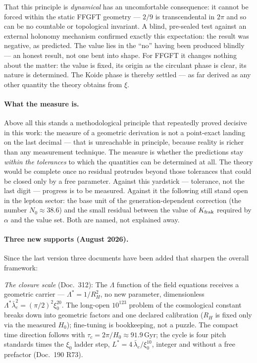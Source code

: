 That this principle is \emph{dynamical} has an uncomfortable consequence:
it cannot be forced within the static FFGFT geometry --- $2/9$ is
transcendental in $2\pi$ and so can be no countable or topological invariant.
A blind, pre-sealed test against an external holonomy mechanism confirmed
exactly this expectation: the result was negative, as predicted. The value
lies in the \enquote{no} having been produced blindly --- an honest result,
not one bent into shape. For FFGFT it changes nothing about the matter: the value
is fixed, its origin as the circulant phase is clear, its nature is
determined. The Koide phase is thereby settled --- as far derived as any other
quantity the theory obtains from $\xi$.

\paragraph{What the measure is.} Above all this stands a methodological
principle that repeatedly proved decisive in this work: the measure of a
geometric derivation is not a point-exact landing on the last decimal ---
that is unreachable in principle, because reality is richer than any
measurement technique. The measure is whether the predictions stay
\emph{within the tolerances} to which the quantities can be determined at
all. The theory would be complete once no residual protrudes beyond those
tolerances that could be closed only by a free parameter. Against this
yardstick --- tolerance, not the last digit --- progress is to be measured.
Against it the following still stand open in the lepton sector: the base
unit of the generation-dependent correction (the number $N_0 \approx 38.6$)
and the small residual between the value of $K_{\rm frak}$ required by
$\alpha$ and the value set. Both are named, not explained away.

\paragraph{Three new supports (August 2026).}
Since the last version three documents have been added that sharpen the
overall framework:

\emph{The closure scale} (Doc.~312): The $\Lambda$ function of the field
equations receives a geometric carrier --- $\Lambda^* = 1/R_H^2$, no new
parameter, dimensionless $\Lambda^*\bar\lambda_e^2 = (\pi/2)^2\xi_0^{20}$.
The long-open $10^{123}$ problem of the cosmological constant breaks down
into geometric factors and one declared calibration ($R_H$ is fixed only
via the measured $H_0$); fine-tuning is bookkeeping, not a puzzle.
The compact time direction follows with
$\tau_c = 2\pi/H_0 \approx 91.9$\,Gyr; the cycle is four pitch standards
times the $\xi_0$ ladder step, $L^* = 4\,\bar\lambda_e/\xi_0^{10}$,
integer and without a free prefactor (Doc.~190 R73).

